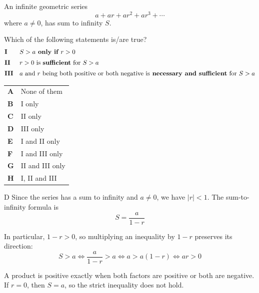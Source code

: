\documentclass[11pt,a4paper]{article}
\begin{document}
\begin{enumerate}[label=\textbf{\arabic*.},leftmargin=*,itemsep=0pt,start=4]
\questionitem[Logic]
An infinite geometric series
\[
a + ar + ar^2 + ar^3 + \cdots
\]
where $a \ne 0$, has sum to infinity $S$.

Which of the following statements is/are true?
\[
\begin{array}{@{}ll@{}}
\textbf{I} & S > a \textbf{ only if } r > 0 \\[5pt]
\textbf{II} & r > 0 \text{ is }\textbf{sufficient}\text{ for } S>a  \\[5pt]
\textbf{III} & a \text{ and } r \text{ being both positive or both negative is}\textbf{ necessary and sufficient} \text{ for } S > a
\end{array}
\]

\par\vspace*{12pt}
\begin{tabularx}{\linewidth}{@{}>{\bfseries}l Y@{}}
A &
None of them
\\[0.8em]
B &
I only
\\[0.8em]
C &
II only
\\[0.8em]
D &
III only
\\[0.8em]
E &
I and II only
\\[0.8em]
F &
I and III only
\\[0.8em]
G &
II and III only
\\[0.8em]
H &
I, II and III
\\
\end{tabularx}

\begin{djsSolution}{D}
Since the series has a sum to infinity and $a\ne0$, we have $|r|<1$. The sum-to-infinity formula is
\[
S=\frac{a}{1-r}
\]

In particular, $1-r>0$, so multiplying an inequality by $1-r$ preserves its direction:
\[
S>a
\iff \frac{a}{1-r}>a
\iff a>a(1-r)
\iff \boxed{ar>0}
\]

A product is positive exactly when both factors are positive or both are negative. If $r=0$, then $S=a$, so the strict inequality does not hold.


\end{djsSolution}
\end{enumerate}
\end{document}
